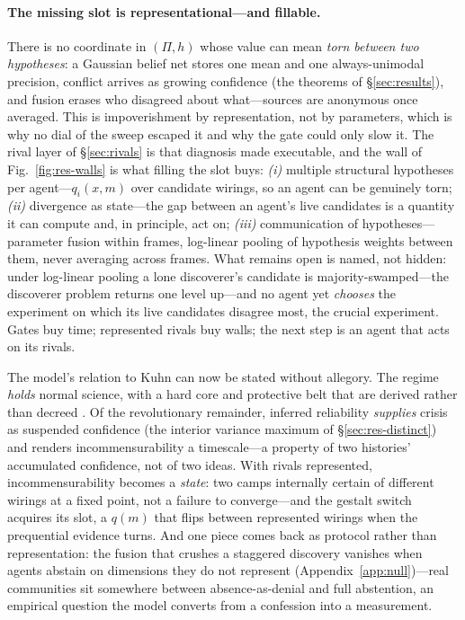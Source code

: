 \documentclass[runningheads]{llncs}
\begin{document}
\paragraph{The missing slot is representational---and fillable.}
There is no coordinate in $(\Pi,h)$ whose value can mean \emph{torn between two hypotheses}: a
Gaussian belief net stores one mean and one always-unimodal precision, conflict arrives as
growing confidence (the theorems of \S\ref{sec:results}), and fusion erases who disagreed about
what---sources are anonymous once averaged. This is impoverishment by representation, not by
parameters, which is why no dial of the sweep escaped it and why the gate could only slow it.
The rival layer of \S\ref{sec:rivals} is that diagnosis made executable, and the wall of
Fig.~\ref{fig:res-walls} is what filling the slot buys: \emph{(i)} multiple structural
hypotheses per agent---$q_i(x,m)$ over candidate wirings, so an agent can be genuinely torn;
\emph{(ii)} divergence as state---the gap between an agent's live candidates is a quantity it
can compute and, in principle, act on; \emph{(iii)} communication of hypotheses---parameter
fusion within frames, log-linear pooling of hypothesis weights between them, never averaging
across frames. What remains open is named, not hidden: under log-linear pooling a lone
discoverer's candidate is majority-swamped---the discoverer problem returns one level up---and
no agent yet \emph{chooses} the experiment on which its live candidates disagree most, the
crucial experiment. Gates buy time; represented rivals buy walls; the next step is an agent
that acts on its rivals.

The model's relation to Kuhn can now be stated without allegory. The regime \emph{holds} normal
science, with a hard core and protective belt that are derived rather than decreed
\citep{lakatos1970}. Of the revolutionary remainder, inferred reliability \emph{supplies} crisis
as suspended confidence (the interior variance maximum of \S\ref{sec:res-distinct}) and renders
incommensurability \citep{kuhn1983} a timescale---a property of two histories' accumulated
confidence, not of two ideas. With rivals represented, incommensurability becomes a
\emph{state}: two camps internally certain of different wirings at a fixed point, not a
failure to converge---and the gestalt switch acquires its slot, a $q(m)$ that flips between
represented wirings when the prequential evidence turns. And one piece comes back as protocol
rather than representation: the fusion that crushes a staggered discovery vanishes when agents
abstain on dimensions they do not represent (Appendix~\ref{app:null})---real communities sit
somewhere between absence-as-denial and full abstention, an empirical question the model
converts from a confession into a measurement.
\end{document}
